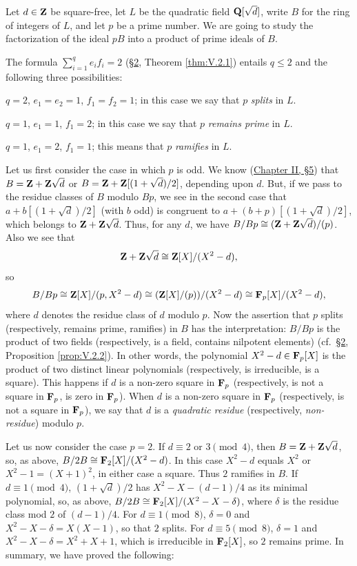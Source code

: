 Let $d\in\mathbf{Z}$ be square-free, let $L$ be the quadratic field $\mathbf{Q}[\sqrt{d}]$,
write $B$ for the ring of integers of $L$, and let $p$ be a prime number. We
are going to study the factorization of the ideal $pB$ into a product of
prime ideals of $B$.

The formula $\sum_{i=1}^{q}e_{i}f_{i}=2$ (\hyperref[sec:5.2]{§2}, Theorem \ref{thm:V.2.1})
entails $q\leq2$ and the following three possibilities:
\begin{alist}
\item $q=2$, $e_{1}=e_{2}=1$, $f_{1}=f_{2}=1$;
in this case we say that $p$ \emph{splits} in $L$.
\item $q=1$, $e_{1}=1$, $f_{1}=2$;
in this case we say that $p$ \emph{remains prime} in $L$.
\item $q=1$, $e_{1}=2$, $f_{1}=1$;
this means that $p$ \emph{ramifies} in $L$.
\end{alist}

Let us first consider the case in which $p$ is odd. We know (\hyperref[sec:2.5]{Chapter II, §5})
that $B=\mathbf{Z}+\mathbf{Z}\sqrt{d}$ or $B=\mathbf{Z}+\mathbf{Z}[(1+\sqrt{d})/2]$, depending upon $d$.
But, if we pass to the residue classes of $B$ modulo $Bp$, we see in the
second case that $a+b[(1+\sqrt{d})/2]$ (with $b$ odd) is congruent to
$a+(b+p)[(1+\sqrt{d})/2]$, which belongs to $\mathbf{Z}+\mathbf{Z}\sqrt{d}$. Thus, for any
$d$, we have $B/Bp\cong(\mathbf{Z}+\mathbf{Z}\sqrt{d})/(p)$. Also we see that
\[
\mathbf{Z}+\mathbf{Z}\sqrt{d}\cong\mathbf{Z}[X]/(X^{2}-d),
\]
so
\[
B/Bp\cong\mathbf{Z}[X]/(p,X^{2}-d)\cong(\mathbf{Z}[X]/(p))/(X^{2}-d)
\cong\mathbf{F}_{p}[X]/(X^{2}-d),
\]
where $d$ denotes the residue class of $d$ modulo $p$. Now the assertion
that $p$ splits (respectively, remains prime, ramifies) in $B$ has the
interpretation: $B/Bp$ is the product of two fields (respectively, is a
field, contains nilpotent elements) (cf.\ \hyperref[sec:5.2]{§2}, Proposition
\ref{prop:V.2.2}). In other words, the polynomial $X^{2}-d\in\mathbf{F}_{p}[X]$ is
the product of two distinct linear polynomials (respectively, is
irreducible, is a square). This happens if $d$ is a non-zero square in
$\mathbf{F}_{p}$ (respectively, is not a square in $\mathbf{F}_{p}$, is zero in $\mathbf{F}_{p}$).
When $d$ is a non-zero square in $\mathbf{F}_{p}$ (respectively, is not a square in
$\mathbf{F}_{p}$), we say that $d$ is a \emph{quadratic residue} (respectively,
\emph{non-residue}) modulo $p$.

Let us now consider the case $p=2$. If $d\equiv2$ or $3\pmod4$, then
$B=\mathbf{Z}+\mathbf{Z}\sqrt{d}$, so, as above, $B/2B\cong\mathbf{F}_{2}[X]/(X^{2}-d)$. In this
case $X^{2}-d$ equals $X^{2}$ or $X^{2}-1=(X+1)^{2}$, in either case a
square. Thus $2$ ramifies in $B$. If $d\equiv1\pmod4$, $(1+\sqrt{d})/2$ has
$X^{2}-X-(d-1)/4$ as its minimal polynomial, so, as above,
$B/2B\cong\mathbf{F}_{2}[X]/(X^{2}-X-\delta)$, where $\delta$ is the residue class
mod $2$ of $(d-1)/4$. For $d\equiv1\pmod8$, $\delta=0$ and
$X^{2}-X-\delta=X(X-1)$, so that $2$ splits. For $d\equiv5\pmod8$,
$\delta=1$ and $X^{2}-X-\delta=X^{2}+X+1$, which is irreducible in
$\mathbf{F}_{2}[X]$, so $2$ remains prime. In summary, we have proved the following:


